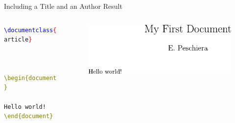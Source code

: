 \begin{frame}[fragile]{Including a Title and an Author}
Result
\vspace{.5cm}
	\begin{columns}[t]
		\begin{column}{.5\textwidth}
			\texttt{\textcolor{blue}{\textbackslash documentclass}\textcolor{red}{\{}article\textcolor{red}{\}}
			\\
			\\
			\\
			\\\textcolor{olive}{\textbackslash begin\{document\}}
			\\\quad{}
			\\\quad Hello world!
			\\\textcolor{olive}{\textbackslash end\{document\}}
			}
		\end{column}
		\begin{column}{.5\textwidth}
			\begin{figure}
			\includegraphics[width=.9\linewidth, frame, trim={-1cm -1cm -1cm -1cm},clip]{Figures/doc1}
			\end{figure}
		\end{column}
	\end{columns}	
\end{frame}

